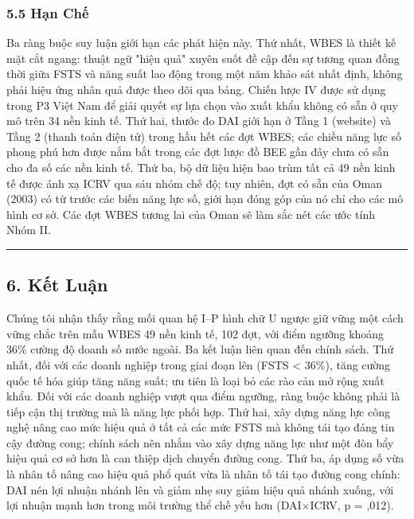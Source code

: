\documentclass[12pt,a4paper]{article}
\begin{document}
\hypertarget{55-hux1ea1n-chux1ebf}{%
\subsubsection{5.5 Hạn Chế}\label{55-hux1ea1n-chux1ebf}}

Ba ràng buộc suy luận giới hạn các phát hiện này. Thứ nhất, WBES là
thiết kế mặt cắt ngang: thuật ngữ "hiệu quả" xuyên suốt đề cập đến sự
tương quan đồng thời giữa FSTS và năng suất lao động trong một năm khảo
sát nhất định, không phải hiệu ứng nhân quả được theo dõi qua bảng.
Chiến lược IV được sử dụng trong P3 Việt Nam để giải quyết sự lựa chọn
vào xuất khẩu không có sẵn ở quy mô trên 34 nền kinh tế. Thứ hai, thước
đo DAI giới hạn ở Tầng 1 (website) và Tầng 2 (thanh toán điện tử) trong
hầu hết các đợt WBES; các chiều năng lực số phong phú hơn được nắm bắt
trong các đợt lược đồ BEE gần đây chưa có sẵn cho đa số các nền kinh tế.
Thứ ba, bộ dữ liệu hiện bao trùm tất cả 49 nền kinh tế được ánh xạ ICRV
qua sáu nhóm chế độ; tuy nhiên, đợt có sẵn của Oman (2003) có từ trước
các biến năng lực số, giới hạn đóng góp của nó chỉ cho các mô hình cơ
sở. Các đợt WBES tương lai của Oman sẽ làm sắc nét các ước tính Nhóm II.

\begin{center}\rule{0.5\linewidth}{0.5pt}\end{center}

\hypertarget{6-kux1ebft-luux1eadn}{%
\subsection{6. Kết Luận}\label{6-kux1ebft-luux1eadn}}

Chúng tôi nhận thấy rằng mối quan hệ I--P hình chữ U ngược giữ vững một
cách vững chắc trên mẫu WBES 49 nền kinh tế, 102 đợt, với điểm ngưỡng
khoảng 36\% cường độ doanh số nước ngoài. Ba kết luận liên quan đến
chính sách. Thứ nhất, đối với các doanh nghiệp trong giai đoạn lên (FSTS
\textless{} 36\%), tăng cường quốc tế hóa giúp tăng năng suất; ưu tiên
là loại bỏ các rào cản mở rộng xuất khẩu. Đối với các doanh nghiệp vượt
qua điểm ngưỡng, ràng buộc không phải là tiếp cận thị trường mà là năng
lực phối hợp. Thứ hai, xây dựng năng lực công nghệ nâng cao mức hiệu quả
ở tất cả các mức FSTS mà không tái tạo đáng tin cậy đường cong; chính
sách nên nhắm vào xây dựng năng lực như một đòn bẩy hiệu quả cơ sở hơn
là can thiệp dịch chuyển đường cong. Thứ ba, áp dụng số vừa là nhân tố
nâng cao hiệu quả phổ quát vừa là nhân tố tái tạo đường cong chính: DAI
nén lợi nhuận nhánh lên và giảm nhẹ suy giảm hiệu quả nhánh xuống, với
lợi nhuận mạnh hơn trong môi trường thể chế yếu hơn (DAI×ICRV, p =
,012).
\end{document}
